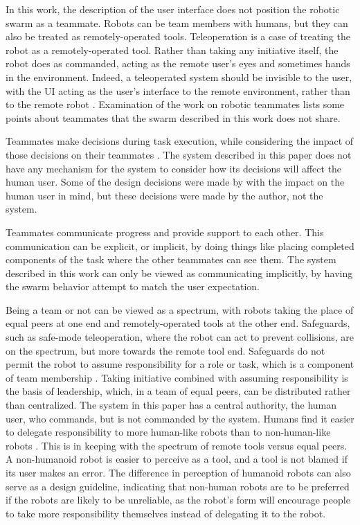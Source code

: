 In this work, the description of the user interface does not position the robotic swarm as a teammate. 
Robots can be team members with humans, but they can also be treated as remotely-operated tools. 
Teleoperation is a case of treating the robot as a remotely-operated tool. 
Rather than taking any initiative itself, the robot does as commanded, acting as the remote user's eyes and sometimes hands in the environment. 
Indeed, a teleoperated system should be invisible to the user, with the UI acting as the user's interface to the remote environment, rather than to the remote robot \citep{larochelle2011establishing}.
Examination of the work on robotic teammates lists some points about teammates that the swarm described in this work does not share.  

Teammates make decisions during task execution, while considering the impact of those decisions on their teammates \citep{shah2011improved}. 
The system described in this paper does not have any mechanism for the system to consider how its decisions will affect the human user. 
Some of the design decisions were made by with the impact on the human user in mind, but these decisions were made by the author, not the system. 

Teammates communicate progress and provide support  to each other. 
This communication can be explicit, or implicit, by doing things like placing completed components of the task where the other teammates can see them. 
The system described in this work can only be viewed as communicating implicitly, by having the swarm behavior attempt to match the user expectation. 

Being a team or not can be viewed as a spectrum, with robots taking the place of equal peers at one end and remotely-operated tools at the other end. 
Safeguards, such as safe-mode teleoperation, where the robot can act to prevent collisions, are on the spectrum, but more towards the remote tool end. 
Safeguards do not permit the robot to assume responsibility for a role or task, which is a component of team membership \citep{bruemmer2005shared}. 
Taking initiative combined with assuming responsibility is the basis of leadership, which, in a team of equal peers, can be distributed rather than centralized. 
The system in this paper has a central authority, the human user, who commands, but is not commanded by the system. 
Humans find it easier to delegate responsibility to more human-like robots than to non-human-like robots \citep{hinds2004whose}. 
This is in keeping with the spectrum of remote tools versus equal peers. 
A non-humanoid robot is easier to perceive as a tool, and a tool is not blamed if its user makes an error. 
The difference in perception of humanoid robots can also serve as a design guideline, indicating that non-human robots are to be preferred if the robots are likely to be unreliable, as the robot's form will encourage people to take more responsibility themselves instead of delegating it to the robot. 

